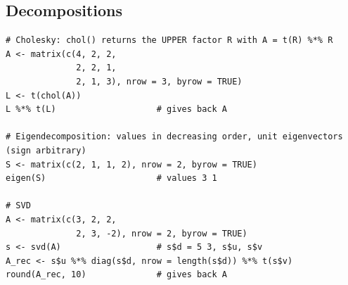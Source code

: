 \subsection{Decompositions}

\begin{lstlisting}
# Cholesky: chol() returns the UPPER factor R with A = t(R) %*% R
A <- matrix(c(4, 2, 2,
              2, 2, 1,
              2, 1, 3), nrow = 3, byrow = TRUE)
L <- t(chol(A))
L %*% t(L)                    # gives back A

# Eigendecomposition: values in decreasing order, unit eigenvectors (sign arbitrary)
S <- matrix(c(2, 1, 1, 2), nrow = 2, byrow = TRUE)
eigen(S)                      # values 3 1

# SVD
A <- matrix(c(3, 2, 2,
              2, 3, -2), nrow = 2, byrow = TRUE)
s <- svd(A)                   # s$d = 5 3, s$u, s$v
A_rec <- s$u %*% diag(s$d, nrow = length(s$d)) %*% t(s$v)
round(A_rec, 10)              # gives back A
\end{lstlisting}

